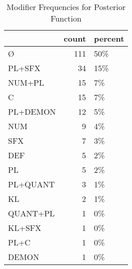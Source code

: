 \begin{table}[htbp!]
\centering
\caption{Modifier Frequencies for Posterior Function}
\label{table:post_mod_cp}
\begin{tabular}{lrl}
\toprule
{} &  count & percent \\
\midrule
Ø        &    111 &     50\% \\
PL+SFX   &     34 &     15\% \\
NUM+PL   &     15 &      7\% \\
C        &     15 &      7\% \\
PL+DEMON &     12 &      5\% \\
NUM      &      9 &      4\% \\
SFX      &      7 &      3\% \\
DEF      &      5 &      2\% \\
PL       &      5 &      2\% \\
PL+QUANT &      3 &      1\% \\
KL       &      2 &      1\% \\
QUANT+PL &      1 &      0\% \\
KL+SFX   &      1 &      0\% \\
PL+C     &      1 &      0\% \\
DEMON    &      1 &      0\% \\
\bottomrule
\end{tabular}
\end{table}
